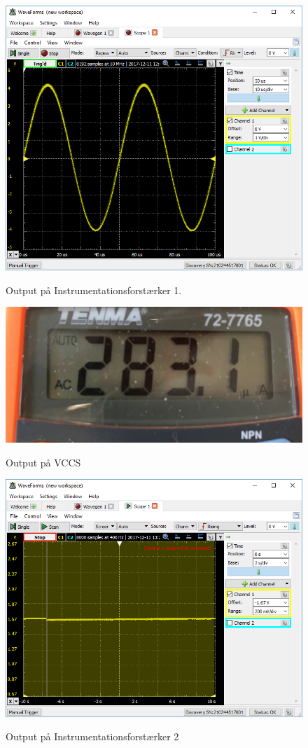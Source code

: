\begin{figure}[H] 
\centering
{\includegraphics[width=12cm]
{Figure/integrationstestINA1ud}}
\caption{Output på Instrumentationsforstærker 1.}
\label{fig:integrationstestINA1ud}
\end{figure}




\begin{figure}[H] 
\centering
{\includegraphics[width=12cm]
{Figure/integrationstestVCCSud}}
\caption{Output på VCCS}
\label{fig:integrationstestVCCSud}
\end{figure}

\begin{figure}[H] 
\centering
{\includegraphics[width=12cm]
{Figure/integrationstestINA2ud}}
\caption{Output på Instrumentationsforstærker 2}
\label{fig:integrationstestINA2ud}
\end{figure}

